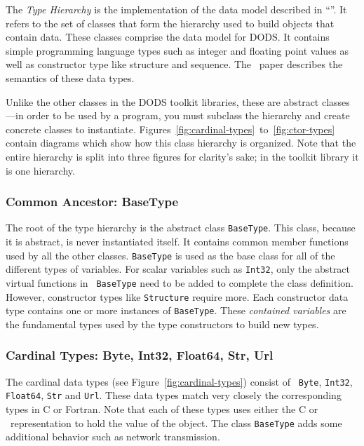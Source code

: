 The {\em Type Hierarchy\/} is the implementation of the data model described
in ``\DAP''. It refers to the set of classes that form the hierarchy used to
build objects that contain data. These classes comprise the data model for
DODS. It contains simple programming language types such as integer and
floating point values as well as constructor type like structure and
sequence. The \dap\ paper describes the semantics of these data types.

Unlike the other classes in the DODS toolkit libraries, these are abstract
classes---in order to be used by a program, you must subclass the hierarchy
and create concrete classes to instantiate.
Figures~\ref{fig:cardinal-types}~to~\ref{fig:ctor-types} contain diagrams
which show how this class hierarchy is organized. Note that the entire
hierarchy is split into three figures for clarity's sake; in the toolkit
library it is one hierarchy. 

\subsubsection{Common Ancestor: BaseType}

The root of the type hierarchy is the abstract class {\tt BaseType}. This
class, because it is abstract, is never instantiated itself. It contains
common member functions used by all the other classes. {\tt BaseType} is used
as the base class for all of the different types of variables. For scalar
variables such as {\tt Int32}, only the abstract virtual functions in {\tt
BaseType} need to be added to complete the class definition. However,
constructor types like {\tt Structure} require more. Each constructor data
type contains one or more instances of {\tt BaseType}. These {\em contained
variables\/} are the fundamental types used by the type constructors to build
new types.

\subsubsection{Cardinal Types: Byte, Int32, Float64, Str, Url}

The cardinal data types (see Figure~\ref{fig:cardinal-types}) consist of {\tt
  Byte}, {\tt Int32}, {\tt Float64}, {\tt Str} and {\tt Url}. These data
types match very closely the corresponding types in C or Fortran. Note that
each of these types uses either the C or \Cpp\ representation to hold the
value of the object. The class {\tt BaseType} adds some additional behavior
such as network transmission.

